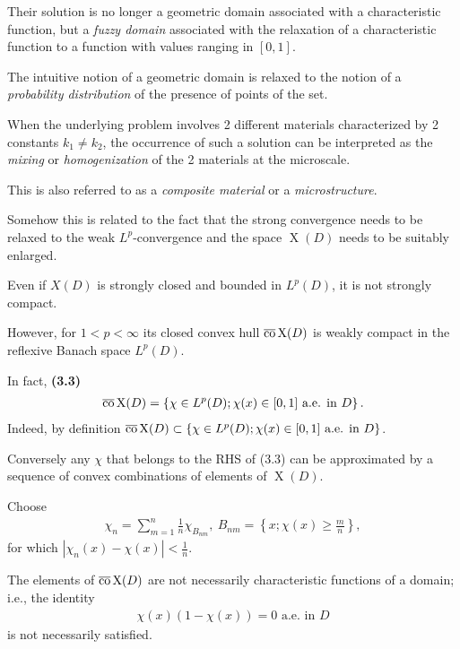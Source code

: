 \documentclass{book}
\numberwithin{equation}{section}
\begin{document}
\begin{enumerate}
    Their solution is no longer a geometric domain associated with a characteristic function, but a \textit{fuzzy domain} associated with the relaxation of a characteristic function to a function with values ranging in $[0,1]$.
    
    The intuitive notion of a geometric domain is relaxed to the notion of a \textit{probability distribution} of the presence of points of the set.
    
    When the underlying problem involves 2 different materials characterized by 2 constants $k_1\ne k_2$, the occurrence of such a solution can be interpreted as the \textit{mixing} or \textit{homogenization} of the 2 materials at the microscale.
    
    This is also referred to as a \textit{composite material} or a \textit{microstructure}.
    
    Somehow this is related to the fact that the strong convergence needs to be relaxed to the weak $L^p$-convergence and the space $\operatorname{X}(D)$ needs to be suitably enlarged.
    
    Even if $X(D)$ is strongly closed and bounded in $L^p(D)$, it is not strongly compact.
    
    However, for $1 < p < \infty$ its closed convex hull $\overline{\rm co}\operatorname{X}(D)$ is weakly compact in the reflexive Banach space $L^p(D)$.
    
    In fact, \textbf{(3.3)}
    \begin{align*}
        \overline{\rm co}\operatorname{X}(D) = \left\{\chi\in L^p(D);\chi(x)\in[0,1] \mbox{ a.e. in } D\right\}.
    \end{align*}
    Indeed, by definition $\overline{\rm co}\operatorname{X}(D)\subset\{\chi\in L^p(D);\chi(x)\in[0,1]\mbox{ a.e. in } D\}$.
    
    Conversely any $\chi$ that belongs to the RHS of (3.3) can be approximated by a sequence of convex combinations of elements of $\operatorname{X}(D)$.
    
    Choose
    \begin{align*}
        \chi_n = \sum_{m=1}^n \frac{1}{n}\chi_{B_{nm}},\ B_{nm} = \left\{x;\chi(x)\ge\frac{m}{n}\right\},
    \end{align*}
    for which $|\chi_n(x) - \chi(x)| < \frac{1}{n}$.
    
    The elements of $\overline{\rm co}\operatorname{X}(D)$ are not necessarily characteristic functions of a domain; i.e., the identity
    \begin{align*}
        \chi(x)\left(1 - \chi(x)\right) = 0 \mbox{ a.e. in } D
    \end{align*}
    is not necessarily satisfied.
    

\end{enumerate}
\end{document}
